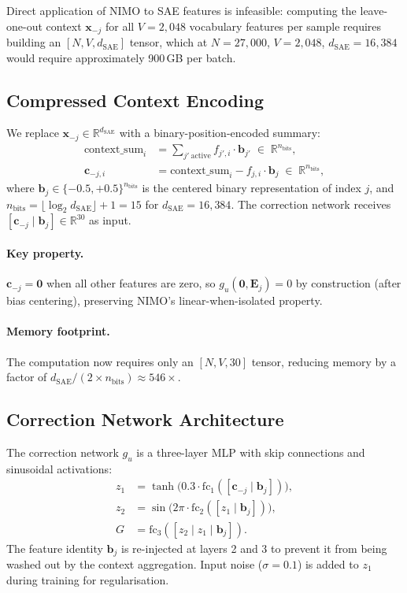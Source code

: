 \documentclass{article}
\newcommand{\bfx}{\mathbf{x}}
\newcommand{\bfc}{\mathbf{c}}
\newcommand{\bfb}{\mathbf{b}}
\begin{document}
Direct application of NIMO to SAE features is infeasible: computing the leave-one-out context $\bfx_{-j}$ for all $V = 2{,}048$ vocabulary features per sample requires building an $[N, V, d_\mathrm{SAE}]$ tensor, which at $N = 27{,}000$, $V = 2{,}048$, $d_\mathrm{SAE} = 16{,}384$ would require approximately 900\,GB per batch.

\subsection{Compressed Context Encoding}

We replace $\bfx_{-j} \in \mathbb{R}^{d_\mathrm{SAE}}$ with a binary-position-encoded summary:
\begin{align}
    \mathrm{context\_sum}_i &= \sum_{j'\ \mathrm{active}} f_{j',i} \cdot \bfb_{j'} \;\in\; \mathbb{R}^{n_\mathrm{bits}}, \\
    \bfc_{-j,i} &= \mathrm{context\_sum}_i - f_{j,i} \cdot \bfb_j \;\in\; \mathbb{R}^{n_\mathrm{bits}},
\end{align}
where $\bfb_j \in \{-0.5, +0.5\}^{n_\mathrm{bits}}$ is the centered binary representation of index $j$, and $n_\mathrm{bits} = \lfloor \log_2 d_\mathrm{SAE} \rfloor + 1 = 15$ for $d_\mathrm{SAE} = 16{,}384$.
The correction network receives $[\bfc_{-j} \mid \bfb_j] \in \mathbb{R}^{30}$ as input.

\paragraph{Key property.}
$\bfc_{-j} = \mathbf{0}$ when all other features are zero, so $g_u(\mathbf{0}, \mathbf{E}_j) = 0$ by construction (after bias centering), preserving NIMO's linear-when-isolated property.

\paragraph{Memory footprint.}
The computation now requires only an $[N, V, 30]$ tensor, reducing memory by a factor of $d_\mathrm{SAE} / (2 \times n_\mathrm{bits}) \approx 546\times$.

\subsection{Correction Network Architecture}

The correction network $g_u$ is a three-layer MLP with skip connections and sinusoidal activations:
\begin{align}
    z_1 &= \tanh\!\bigl(0.3 \cdot \mathrm{fc}_1([\bfc_{-j} \mid \bfb_j])\bigr), \\
    z_2 &= \sin\!\bigl(2\pi \cdot \mathrm{fc}_2([z_1 \mid \bfb_j])\bigr), \\
    G   &= \mathrm{fc}_3([z_2 \mid z_1 \mid \bfb_j]).
\end{align}
The feature identity $\bfb_j$ is re-injected at layers 2 and 3 to prevent it from being washed out by the context aggregation. Input noise ($\sigma = 0.1$) is added to $z_1$ during training for regularisation.
\end{document}
